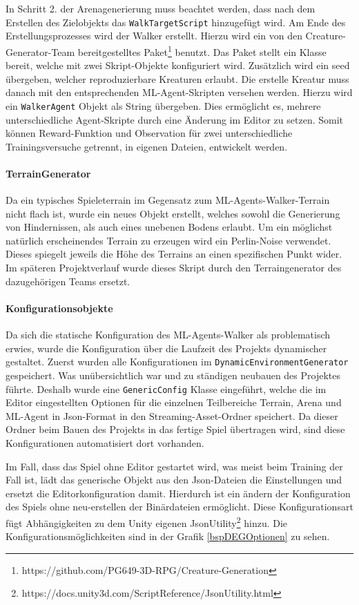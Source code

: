 In Schritt 2. der Arenagenerierung muss beachtet werden, dass nach dem Erstellen des Zielobjekts das \texttt{WalkTargetScript} hinzugefügt wird. Am Ende des Erstellungsprozesses wird der Walker erstellt. Hierzu wird ein von den Creature-Generator-Team bereitgestelltes Paket\footnote{https://github.com/PG649-3D-RPG/Creature-Generation} benutzt. Das Paket stellt ein Klasse bereit, welche mit zwei Skript-Objekte konfiguriert wird. Zusätzlich wird ein seed übergeben, welcher reproduzierbare Kreaturen erlaubt. Die erstelle Kreatur muss danach mit den entsprechenden ML-Agent-Skripten versehen werden. Hierzu wird ein \texttt{WalkerAgent} Objekt als String übergeben. Dies ermöglicht es, mehrere unterschiedliche Agent-Skripte durch eine Änderung im Editor zu setzen. Somit können Reward-Funktion und Observation für zwei unterschiedliche Trainingsversuche getrennt, in eigenen Dateien, entwickelt werden.

\paragraph{TerrainGenerator}
Da ein typisches Spieleterrain im Gegensatz zum ML-Agents-Walker-Terrain nicht flach ist, wurde ein neues Objekt erstellt, welches sowohl die Generierung von Hindernissen, als auch eines unebenen Bodens erlaubt. Um ein möglichst natürlich erscheinendes Terrain zu erzeugen wird ein Perlin-Noise verwendet. Dieses spiegelt jeweils die Höhe des Terrains an einen spezifischen Punkt wider. Im späteren Projektverlauf wurde dieses Skript durch den Terraingenerator des dazugehörigen Teams ersetzt.

\paragraph{Konfigurationsobjekte}
Da sich die statische Konfiguration des ML-Agents-Walker als problematisch erwies, wurde die Konfiguration über die Laufzeit des Projekts dynamischer gestaltet. Zuerst wurden alle Konfigurationen im \texttt{DynamicEnvironmentGenerator} gespeichert. Was unübersichtlich war und zu ständigen neubauen des Projektes führte. Deshalb wurde eine \texttt{GenericConfig} Klasse eingeführt, welche die im Editor eingestellten Optionen für die einzelnen Teilbereiche Terrain, Arena und ML-Agent in Json-Format in den Streaming-Asset-Ordner speichert. Da dieser Ordner beim Bauen des Projekts in das fertige Spiel übertragen wird, sind diese Konfigurationen automatisiert dort vorhanden. 

Im Fall, dass das Spiel ohne Editor gestartet wird, was meist beim Training der Fall ist, lädt das generische Objekt aus den Json-Dateien die Einstellungen und ersetzt die Editorkonfiguration damit. Hierdurch ist ein ändern der Konfiguration des Spiels ohne neu-erstellen der Binärdateien ermöglicht. Diese Konfigurationsart fügt Abhängigkeiten zu dem Unity eigenen JsonUtility\footnote{https://docs.unity3d.com/ScriptReference/JsonUtility.html} hinzu. Die Konfigurationsmöglichkeiten sind in der Grafik \ref{bspDEGOptionen} zu sehen.


